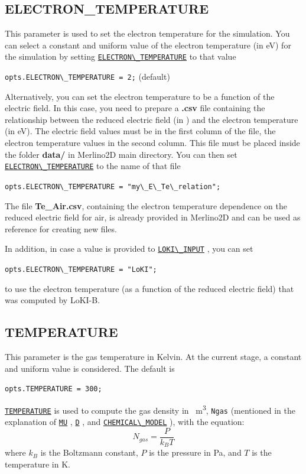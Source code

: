 \documentclass[12pt,a4paper]{article}
\newcommand{\matlabs}[1]{{\lstinline[style=MatlabStyle]!#1!}}
\newcommand{\seclink}[2]{%
	\begingroup
	\hypersetup{linkcolor=orange}%
	\hyperref[sec:#1]{\matlabs{#2}}%
	\endgroup
}
\begin{document}
	\subsection{ELECTRON\_TEMPERATURE}
	\label{sec:electrontemp}
	This parameter is used to set the electron temperature for the simulation.
	You can select a constant and uniform value of the electron temperature (in \unit{\electronvolt}) for the simulation by setting \seclink{electrontemp}{ELECTRON\_TEMPERATURE} to that value 
	
	\matlabs{opts.ELECTRON\_TEMPERATURE = 2;} (default)
	
	\noindent Alternatively, you can set the electron temperature to be a function of the electric field. In this case, you need to prepare a \textbf{.csv} file containing the relationship between the reduced electric field (in \unit{\Td}) and the electron temperature (in \unit{\electronvolt}). The electric field values must be in the first column of the file, the electron temperature values in the second column. This file must be placed inside the folder \textbf{data/} in Merlino2D main directory. You can then set \seclink{electrontemp}{ELECTRON\_TEMPERATURE} to the name of that file
	
	\matlabs{opts.ELECTRON\_TEMPERATURE = "my\_E\_Te\_relation";}
	
	\noindent The file \textbf{Te\_Air.csv}, containing the electron temperature dependence on the reduced electric field for air, is already provided in Merlino2D and can be used as reference for creating new files.
	
	\noindent In addition, in case a value is provided to \seclink{lokiinput}{LOKI\_INPUT}, you can set 
	
	\matlabs{opts.ELECTRON\_TEMPERATURE = "LoKI";}
	
	\noindent to use the electron temperature (as a function of the reduced electric field) that was computed by LoKI-B. 
	
	\subsection{TEMPERATURE}
	\label{sec:temperature}
	This parameter is the gas temperature in Kelvin. At the current stage, a constant and uniform value is considered. The default is
	
	\matlabs{opts.TEMPERATURE = 300;}
	
	\noindent \seclink{temperature}{TEMPERATURE} is used to compute the gas density in \unit{\per\cubic\meter}, \matlabs{Ngas} (mentioned in the explanation of \seclink{mu}{MU}, \seclink{d}{D}, and \seclink{chemicalmodel}{CHEMICAL\_MODEL}), with the equation:
	\[N_{gas} = \frac{P}{k_B T}\]
	where $k_B$ is the Boltzmann constant, $P$ is the pressure in \unit{\pascal}, and $T$ is the temperature in \unit{\kelvin}.
	
\end{document}
